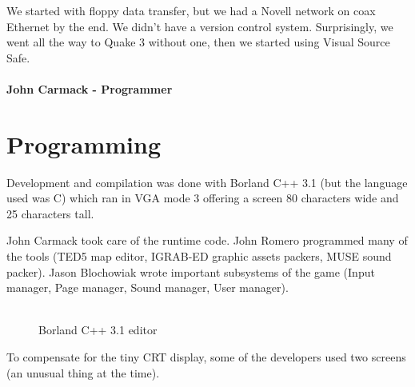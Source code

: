 \documentclass[book.tex]{subfiles}
\begin{document}
 \begin{fancyquotes}
We started with floppy data transfer, but we had a Novell network on coax Ethernet by the end. We didn't have a version control system.  Surprisingly, we went all the way to Quake 3 without one, then we started using Visual Source Safe.\\
 \\
\textbf{John Carmack - Programmer}
\end{fancyquotes}


























\section{Programming}



Development and compilation was done with Borland C++ 3.1 (but the language used was C) which ran in VGA mode 3 offering a screen 80 characters wide and 25 characters tall.\\
\par
John Carmack took care of the runtime code. John Romero programmed many of the tools (TED5 map editor, IGRAB-ED graphic assets packers, MUSE sound packer). Jason Blochowiak wrote important subsystems of the game (Input manager, Page manager, Sound manager, User manager).\\
\\
\begin{figure}[H]
\centering
\caption{Borland C++ 3.1 editor}
\end{figure}


To compensate for the tiny CRT display, some of the developers used two screens (an unusual thing at the time).\\
\end{document}
